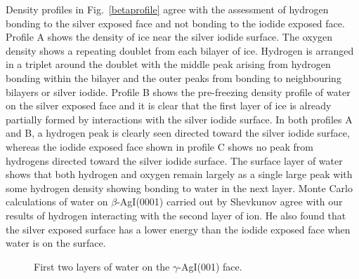 \documentclass[titlepage]{article}
\begin{document}
\indent Density profiles in Fig.~\ref{betaprofile} agree with the assessment of hydrogen bonding to the silver exposed face and not bonding to the iodide exposed face.  Profile A shows the density of ice near the silver iodide surface.  The oxygen density shows a repeating doublet from each bilayer of ice.  Hydrogen is arranged in a triplet around the doublet with the middle peak arising from hydrogen bonding within the bilayer and the outer peaks from bonding to neighbouring bilayers or silver iodide.  Profile B shows the pre-freezing density profile of water on the silver exposed face and it is clear that the first layer of ice is already partially formed by interactions with the silver iodide surface.  In both profiles A and B, a hydrogen peak is clearly seen directed toward the silver iodide surface, whereas the iodide exposed face shown in profile C shows no peak from hydrogens directed toward the silver iodide surface.  The surface layer of water shows that both hydrogen and oxygen remain largely as a single large peak with some hydrogen density showing bonding to water in the next layer.  Monte Carlo calculations of water on $\beta$-AgI(0001) carried out by Shevkunov agree with our results of hydrogen interacting with the second layer of ion.  He also found that the silver exposed surface has a lower energy than the iodide exposed face when water is on the surface\cite{S14}.


\begin{figure}[htp]
	\begin{center}
	\caption{First two layers of water on the $\gamma$-AgI(001) face.}
	\end{center}
	\label{gamma001}
\end{figure}
\end{document}
